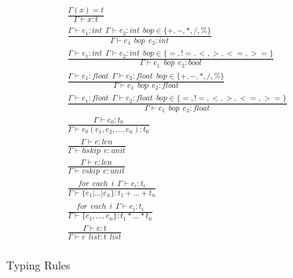 \begin{figure}[!ht]
\small
\begin{align*}
  \tag{T-VARIABLE}
  &\frac
  {\Gamma(x)=t}
  {\Gamma \vdash x:t}\\
  \tag{T-INT ARITH}
  &\frac
  {\Gamma \vdash e_1:int ~~ \Gamma \vdash e_2:int ~~ bop \in \{+,-,*,/,\%\}}
  {\Gamma \vdash e_1 ~~ bop ~~ e_2 :int} \\
  \tag{T-INT REL}
  &\frac
  {\Gamma \vdash e_1:int ~~ \Gamma \vdash e_2:int ~~ bop \in \{=, !=, <, >, <=, >=\}}
  {\Gamma \vdash e_1 ~~ bop ~~ e_2 :bool} \\
  \tag{T-FLOAT ARITH}
  &\frac
  {\Gamma \vdash e_1:float ~~ \Gamma \vdash e_2:float ~~ bop \in \{+,-,*,/,\%\}}
  {\Gamma \vdash e_1 ~~ bop ~~ e_2 :float}\\
  \tag{T-FLOAT REL}
  &\frac
  {\Gamma \vdash e_1:float ~~ \Gamma \vdash e_2:float ~~ bop \in \{=, !=, <, >, <=, >=\}}
  {\Gamma \vdash e_1 ~~ bop ~~ e_2 :float}\\
  \tag{T-CONSTRAINT}
  &\frac
  {\Gamma \vdash e_0:t_0}
  {\Gamma \vdash e_0(e_1, e_2, ..., e_n):t_0}\\
  \tag{T-HSKIP}
  &\frac
  {\Gamma \vdash e:len}
  {\Gamma \vdash hskip ~~ e:unit}\\
  \tag{T-VSKIP}
  &\frac
  {\Gamma \vdash e:len}
  {\Gamma \vdash vskip ~~ e:unit}\\
  \tag{T-UNION}
  &\frac
  {for ~~ each ~~ i ~~ \Gamma \vdash e_i:t_i }
  {\Gamma \vdash \{e_1|...|e_n\}:t_1+...+t_n}\\
  \tag{T-STRUCT}
  &\frac
  {for ~~ each ~~ i ~~ \Gamma \vdash e_i:t_i }
  {\Gamma \vdash \{e_1, ..., e_n\}:t_1*...*t_n}\\
  \tag{T-LIST}
  &\frac
  {\Gamma \vdash e:t}
  {\Gamma \vdash e~~list:t~~list}\\
\end{align*}
\caption{Typing Rules}\label{fig:typingrule}
\end{figure}
